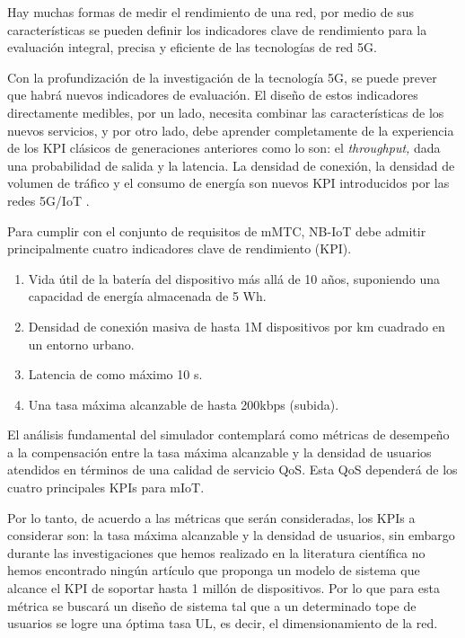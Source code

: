 Hay muchas formas de medir el rendimiento de una red, por medio de sus características se pueden definir los indicadores clave de rendimiento para la evaluación integral, precisa y eficiente de las tecnologías de red 5G.\newline

Con la profundización de la investigación de la tecnología 5G, se puede prever que habrá nuevos indicadores de evaluación. El diseño de estos indicadores directamente medibles, por un lado, necesita combinar las características de los nuevos servicios, y por otro lado, debe aprender completamente de la experiencia de los KPI clásicos de generaciones anteriores como lo son: el \textit{throughput, }dada una\textit{ }probabilidad de salida y la latencia. La densidad de conexión, la densidad de volumen de tráfico y el consumo de energía son nuevos KPI introducidos por las redes 5G/IoT \parencite{WirelessSim}.\newline

Para cumplir con el conjunto de requisitos de mMTC, NB-IoT debe admitir principalmente cuatro indicadores clave de rendimiento (KPI).\newline

\begin{enumerate}
\item  Vida útil de la batería del dispositivo más allá de 10 años, suponiendo una capacidad de energía almacenada de 5 Wh.
\item  Densidad de conexión masiva de hasta 1M dispositivos por km cuadrado en un entorno urbano.
\item  Latencia de como máximo 10 s.
\item  Una tasa máxima alcanzable de hasta 200kbps (subida).
\end{enumerate}

El análisis fundamental del simulador contemplará como métricas de desempeño a la compensación entre la tasa máxima alcanzable y la densidad de usuarios atendidos en términos de una calidad de servicio QoS. Esta QoS dependerá de los cuatro principales KPIs para mIoT.\newline

Por lo tanto, de acuerdo a las métricas que serán consideradas, los KPIs a considerar son: la tasa máxima alcanzable y la densidad de usuarios, sin embargo durante las investigaciones que hemos realizado en la literatura científica no hemos encontrado ningún artículo que proponga un modelo de sistema que alcance el KPI de soportar hasta 1 millón de dispositivos. Por lo que para esta métrica se buscará un diseño de sistema tal que a un determinado tope de usuarios se logre una óptima tasa UL, es decir, el dimensionamiento de la red.

